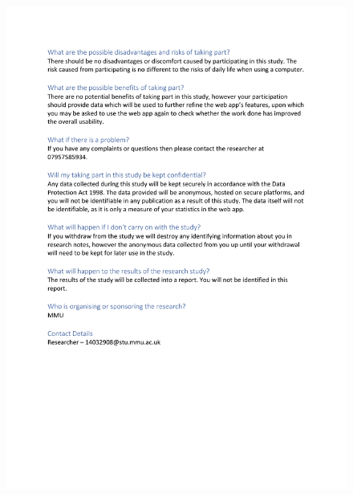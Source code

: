 \documentclass[a4paper,12pt]{report}
\begin{document}
\begin{appendices}
    \begin{figure}[h]
      \centering
      \includegraphics[scale=0.8]{pis-2}
    \end{figure}


\end{appendices}
\end{document}
